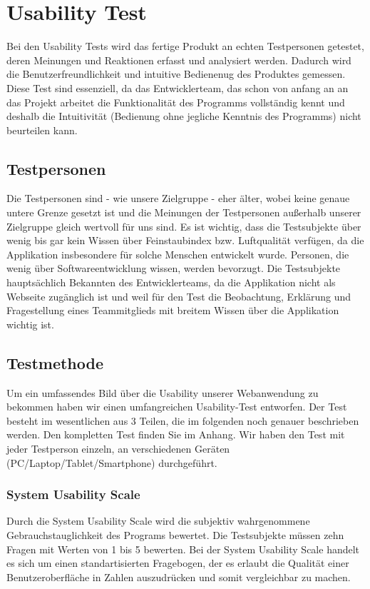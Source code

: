 \section{Usability Test}
Bei den Usability Tests wird das fertige Produkt an echten Testpersonen getestet, deren  Meinungen und Reaktionen erfasst und analysiert werden. Dadurch wird die Benutzerfreundlichkeit und intuitive Bedienenug des Produktes gemessen. Diese Test sind essenziell, da das Entwicklerteam, das schon von anfang an an das Projekt arbeitet die Funktionalität des Programms vollständig kennt und deshalb die Intuitivität (Bedienung ohne jegliche Kenntnis des Programms) nicht beurteilen kann.

  \subsection{Testpersonen}
    Die Testpersonen sind - wie unsere Zielgruppe - eher älter, wobei keine genaue untere Grenze gesetzt ist und die Meinungen der Testpersonen außerhalb unserer Zielgruppe gleich wertvoll für uns sind. Es ist wichtig, dass die Testsubjekte über wenig bis gar kein Wissen über Feinstaubindex bzw. Luftqualität verfügen, da die Applikation insbesondere für solche Menschen entwickelt wurde. Personen, die wenig über Softwareentwicklung wissen, werden bevorzugt. Die Testsubjekte hauptsächlich Bekannten des Entwicklerteams, da die Applikation nicht als Webseite zugänglich ist und weil für den Test die Beobachtung, Erklärung und Fragestellung eines Teammitglieds mit breitem Wissen über die Applikation wichtig ist.

  \subsection{Testmethode}
    Um ein umfassendes Bild über die Usability unserer Webanwendung zu bekommen haben wir einen umfangreichen Usability-Test entworfen. Der Test besteht im wesentlichen aus 3 Teilen, die im folgenden noch genauer beschrieben werden. Den kompletten Test finden Sie im Anhang.
    Wir haben den Test mit jeder Testperson einzeln, an verschiedenen Geräten (PC/Laptop/Tablet/Smartphone) durchgeführt.

    \subsubsection*{System Usability Scale}
      Durch die System Usability Scale wird die subjektiv wahrgenommene Gebrauchstauglichkeit des Programs bewertet. Die Testsubjekte müssen zehn Fragen mit Werten von 1 bis 5 bewerten. Bei der System Usability Scale handelt es sich um einen standartisierten Fragebogen, der es erlaubt die Qualität einer Benutzeroberfläche in Zahlen auszudrücken und somit vergleichbar zu machen.
      
